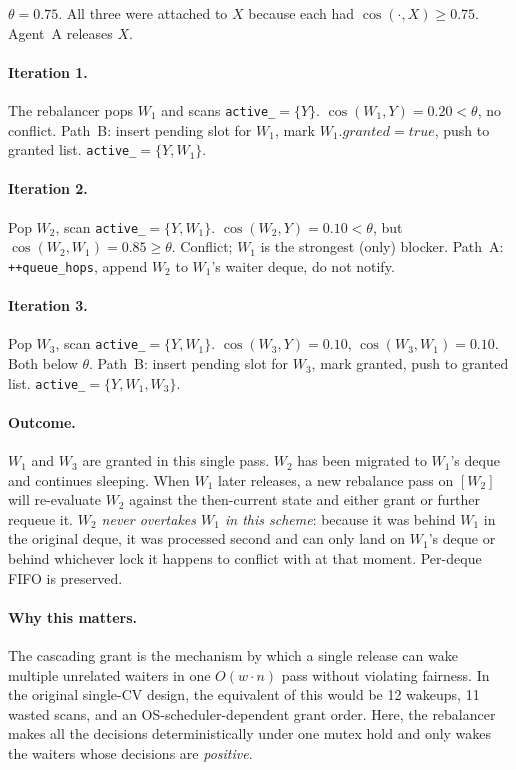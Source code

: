 \documentclass[sigconf]{acmart}
\begin{document}
$\theta=0.75$. All three were attached to $X$ because each had
$\cos(\cdot,X)\ge 0.75$. Agent~A releases $X$.

\paragraph{Iteration 1.} The rebalancer pops $W_1$ and scans
\texttt{active\_}$=\{Y\}$. $\cos(W_1,Y)=0.20<\theta$, no conflict.
Path~B: insert pending slot for $W_1$, mark
$W_1.\textit{granted}=\textit{true}$, push to granted list.
\texttt{active\_}$=\{Y,W_1\}$.

\paragraph{Iteration 2.} Pop $W_2$, scan
\texttt{active\_}$=\{Y,W_1\}$. $\cos(W_2,Y)=0.10<\theta$, but
$\cos(W_2,W_1)=0.85\ge\theta$. Conflict; $W_1$ is the strongest (only)
blocker. Path~A: \texttt{++queue\_hops}, append $W_2$ to $W_1$'s waiter
deque, do not notify.

\paragraph{Iteration 3.} Pop $W_3$, scan
\texttt{active\_}$=\{Y,W_1\}$. $\cos(W_3,Y)=0.10$, $\cos(W_3,W_1)=0.10$.
Both below $\theta$. Path~B: insert pending slot for $W_3$, mark
granted, push to granted list. \texttt{active\_}$=\{Y,W_1,W_3\}$.

\paragraph{\textbf{Outcome.}} $W_1$ and $W_3$ are granted in this single pass.
$W_2$ has been migrated to $W_1$'s deque and continues sleeping. When
$W_1$ later releases, a new rebalance pass on $[W_2]$ will re-evaluate
$W_2$ against the then-current state and either grant or further requeue
it. \emph{$W_2$ never overtakes $W_1$ in this scheme}: because it was
behind $W_1$ in the original deque, it was processed second and can only
land on $W_1$'s deque or behind whichever lock it happens to conflict
with at that moment. Per-deque FIFO is preserved.

\paragraph{\textbf{Why this matters.}}
The cascading grant is the mechanism by which a single release can wake
multiple unrelated waiters in one $O(w \cdot n)$ pass without violating
fairness. In the original single-CV design, the equivalent of this would
be 12 wakeups, 11 wasted scans, and an OS-scheduler-dependent grant
order. Here, the rebalancer makes all the decisions deterministically
under one mutex hold and only wakes the waiters whose decisions are
\emph{positive}.
\end{document}
